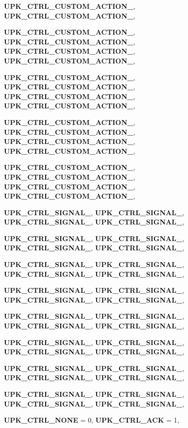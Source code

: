 \begin{DoxyCompactItemize}
{\bf UPK\_\-CTRL\_\-CUSTOM\_\-ACTION\_}, 
{\bf UPK\_\-CTRL\_\-CUSTOM\_\-ACTION\_}, 
\par
{\bf UPK\_\-CTRL\_\-CUSTOM\_\-ACTION\_}, 
{\bf UPK\_\-CTRL\_\-CUSTOM\_\-ACTION\_}, 
{\bf UPK\_\-CTRL\_\-CUSTOM\_\-ACTION\_}, 
{\bf UPK\_\-CTRL\_\-CUSTOM\_\-ACTION\_}, 
\par
{\bf UPK\_\-CTRL\_\-CUSTOM\_\-ACTION\_}, 
{\bf UPK\_\-CTRL\_\-CUSTOM\_\-ACTION\_}, 
{\bf UPK\_\-CTRL\_\-CUSTOM\_\-ACTION\_}, 
{\bf UPK\_\-CTRL\_\-CUSTOM\_\-ACTION\_}, 
\par
{\bf UPK\_\-CTRL\_\-CUSTOM\_\-ACTION\_}, 
{\bf UPK\_\-CTRL\_\-CUSTOM\_\-ACTION\_}, 
{\bf UPK\_\-CTRL\_\-CUSTOM\_\-ACTION\_}, 
{\bf UPK\_\-CTRL\_\-CUSTOM\_\-ACTION\_}, 
\par
{\bf UPK\_\-CTRL\_\-CUSTOM\_\-ACTION\_}, 
{\bf UPK\_\-CTRL\_\-CUSTOM\_\-ACTION\_}, 
{\bf UPK\_\-CTRL\_\-CUSTOM\_\-ACTION\_}, 
{\bf UPK\_\-CTRL\_\-CUSTOM\_\-ACTION\_}, 
\par
{\bf UPK\_\-CTRL\_\-SIGNAL\_}, 
{\bf UPK\_\-CTRL\_\-SIGNAL\_}, 
{\bf UPK\_\-CTRL\_\-SIGNAL\_}, 
{\bf UPK\_\-CTRL\_\-SIGNAL\_}, 
\par
{\bf UPK\_\-CTRL\_\-SIGNAL\_}, 
{\bf UPK\_\-CTRL\_\-SIGNAL\_}, 
{\bf UPK\_\-CTRL\_\-SIGNAL\_}, 
{\bf UPK\_\-CTRL\_\-SIGNAL\_}, 
\par
{\bf UPK\_\-CTRL\_\-SIGNAL\_}, 
{\bf UPK\_\-CTRL\_\-SIGNAL\_}, 
{\bf UPK\_\-CTRL\_\-SIGNAL\_}, 
{\bf UPK\_\-CTRL\_\-SIGNAL\_}, 
\par
{\bf UPK\_\-CTRL\_\-SIGNAL\_}, 
{\bf UPK\_\-CTRL\_\-SIGNAL\_}, 
{\bf UPK\_\-CTRL\_\-SIGNAL\_}, 
{\bf UPK\_\-CTRL\_\-SIGNAL\_}, 
\par
{\bf UPK\_\-CTRL\_\-SIGNAL\_}, 
{\bf UPK\_\-CTRL\_\-SIGNAL\_}, 
{\bf UPK\_\-CTRL\_\-SIGNAL\_}, 
{\bf UPK\_\-CTRL\_\-SIGNAL\_}, 
\par
{\bf UPK\_\-CTRL\_\-SIGNAL\_}, 
{\bf UPK\_\-CTRL\_\-SIGNAL\_}, 
{\bf UPK\_\-CTRL\_\-SIGNAL\_}, 
{\bf UPK\_\-CTRL\_\-SIGNAL\_}, 
\par
{\bf UPK\_\-CTRL\_\-SIGNAL\_}, 
{\bf UPK\_\-CTRL\_\-SIGNAL\_}, 
{\bf UPK\_\-CTRL\_\-SIGNAL\_}, 
{\bf UPK\_\-CTRL\_\-SIGNAL\_}, 
\par
{\bf UPK\_\-CTRL\_\-SIGNAL\_}, 
{\bf UPK\_\-CTRL\_\-SIGNAL\_}, 
{\bf UPK\_\-CTRL\_\-SIGNAL\_}, 
{\bf UPK\_\-CTRL\_\-SIGNAL\_}, 
\par
{\bf UPK\_\-CTRL\_\-NONE} =  0, 
{\bf UPK\_\-CTRL\_\-ACK} =  1, 

\end{DoxyCompactItemize}
